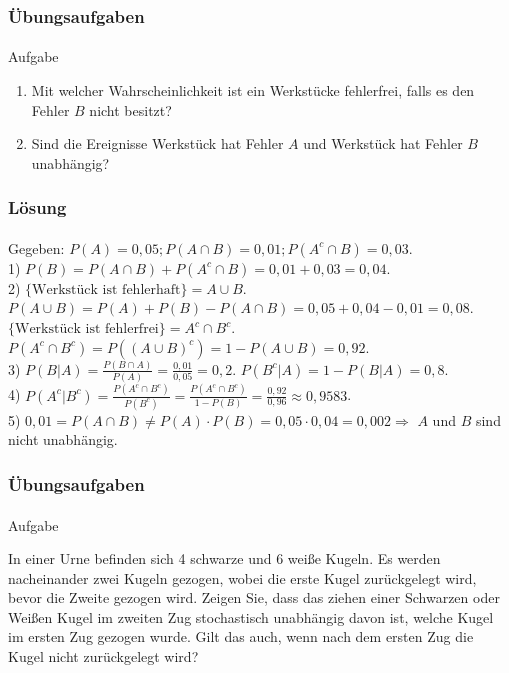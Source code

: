 \documentclass{beamer}
\begin{document}
\begin{frame}
    \frametitle{Übungsaufgaben}
\framesubtitle{}
\begin{block}{Aufgabe}
\begin{enumerate}
\item Mit welcher Wahrscheinlichkeit ist ein Werkstücke fehlerfrei, falls es den Fehler $B$ nicht besitzt?
\item Sind die Ereignisse Werkstück hat Fehler $A$ und Werkstück hat Fehler $B$ unabhängig?
\end{enumerate}
\end{block}
 \end{frame}

\begin{frame}
    \frametitle{Lösung}
\framesubtitle{}
Gegeben: $P(A) = 0,05; P(A \cap B) = 0,01; P(A^c \cap B) = 0,03$.
\\1) $P(B) = P(A \cap B) + P(A^c \cap B) = 0,01 + 0,03 = 0,04$.
\\2) $ \{ \text{Werkstück ist fehlerhaft} \} = A \cup B$.  $P(A \cup B) = P(A) + P(B) - P(A \cap B)= 0,05 + 0,04 -0,01 = 0,08$.
\\ $ \{ \text{Werkstück ist fehlerfrei} \} = A^c \cap B^c$.  $P(A^c \cap B^c) = P((A \cup B)^c) = 1 - P(A \cup B)= 0,92$.
\\3) $P(B | A) = \frac{P(B \cap A)}{P(A)} = \frac{0,01}{0,05} = 0,2$. $P(B^c | A) = 1 -P(B | A)   = 0,8$.
\\4) $P(A^c | B^c) = \frac{P(A^c \cap B^c)}{P(B^c)} = \frac{P(A^c \cap B^c)}{1 - P(B)} = \frac{0,92}{0,96} \approx 0,9583$.
\\5) $0,01 = P(A \cap B) \neq P(A) \cdot P(B) = 0,05 \cdot 0,04 = 0,002 \Rightarrow $ $A$ und $B$ sind nicht unabhängig.
 \end{frame}




\begin{frame}
    \frametitle{Übungsaufgaben}
\framesubtitle{}
\begin{block}{Aufgabe}

In einer Urne befinden sich 4 schwarze und 6 weiße Kugeln.
Es werden nacheinander zwei Kugeln gezogen, wobei die erste Kugel zurückgelegt wird, bevor die Zweite gezogen wird.
Zeigen Sie, dass das ziehen einer Schwarzen oder Weißen Kugel im zweiten Zug stochastisch unabhängig davon ist, welche Kugel im ersten Zug  gezogen wurde.
Gilt das auch, wenn nach dem ersten Zug die Kugel nicht zurückgelegt wird?


\end{block}
 \end{frame}
\end{document}
